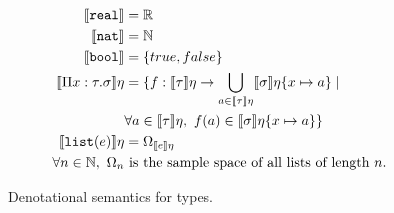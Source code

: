 \begin{figure}
 \begin{align*}
\llbracket \texttt{real} \rrbracket &= \mathbb{R} \\
\llbracket \texttt{nat} \rrbracket &= \mathbb{N}\\
 \llbracket \texttt{bool} \rrbracket &= {\{true, false\}}\\
 \llbracket \Pi x:\tau.\sigma \rrbracket\eta &= \{f: \llbracket \tau \rrbracket\eta \rightarrow 
 \bigcup_{a \in \llbracket \tau \rrbracket\eta} \llbracket \sigma \rrbracket\eta\{x \mapsto a\}
 \mid  \\
 &\forall a \in \llbracket \tau \rrbracket\eta, \ f(a) \in \llbracket \sigma\rrbracket\eta\{x\mapsto a\}\} \\
 \llbracket \texttt{list}(e) \rrbracket\eta &= \Omega_{\llbracket e \rrbracket\eta} \\
 \forall n \in \mathbb{N}, \ \Omega_n &\text{ is the sample space of all lists of length } n. \\
 \end{align*}
 \caption{Denotational semantics for types.}
 \end{figure}

